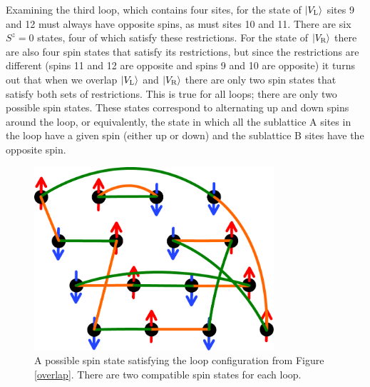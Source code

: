 Examining the third loop, which contains four sites, for the state of $\lvert {V_\text{L}} \rangle$ sites 9 and 12 must always have opposite spins, as must sites 10 and 11.  There are six $S^z=0$ states, four of which satisfy these restrictions.  For the state of $\lvert {V_\text{R}} \rangle$ there are also four spin states that satisfy its restrictions, but since the restrictions are different (spins 11 and 12 are opposite and spins 9 and 10 are opposite) it turns out that when we overlap $\lvert {V_\text{L}} \rangle$ and $\lvert {V_\text{R}} \rangle$ there are only two spin states that satisfy both sets of restrictions.  This is true for all loops; there are only two possible spin states.  These states correspond to alternating up and down spins around the loop, or equivalently, the state in which all the sublattice A sites in the loop have a given spin (either up or down) and the sublattice B sites have the opposite spin.  

\begin{figure} { \includegraphics [width=3.5in]
{./figures/made/spinstate.pdf}
\centering
 \caption[A possible spin state for a given set of valence bonds]{
	A possible spin state satisfying the loop configuration from Figure \ref{overlap}.  There are two compatible spin states for each loop. }
\label{spinstate}
}
\end{figure}

